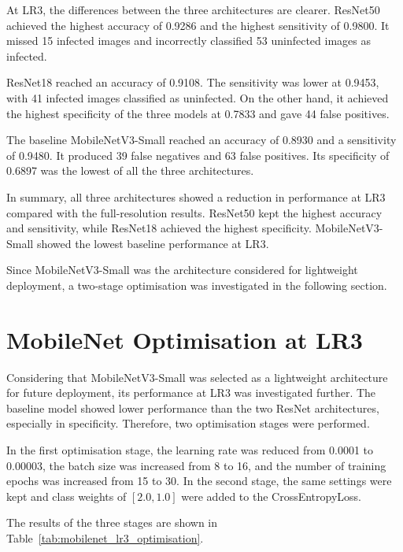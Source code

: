 \FloatBarrier

At LR3, the differences between the three architectures are clearer. ResNet50 achieved the highest accuracy of 0.9286 and the highest sensitivity of 0.9800. It missed 15 infected images and incorrectly classified 53 uninfected images as infected.

ResNet18 reached an accuracy of 0.9108. The sensitivity was lower at 0.9453, with 41 infected images classified as uninfected. On the other hand, it achieved the highest specificity of the three models at 0.7833 and gave 44 false positives.

The baseline MobileNetV3-Small reached an accuracy of 0.8930 and a sensitivity of 0.9480. It produced 39 false negatives and 63 false positives. Its specificity of 0.6897 was the lowest of all the three architectures.

In summary, all three architectures showed a reduction in performance at LR3 compared with the full-resolution results. ResNet50 kept the highest accuracy and sensitivity, while ResNet18 achieved the highest specificity. MobileNetV3-Small showed the lowest baseline performance at LR3. 

Since MobileNetV3-Small was the architecture considered for lightweight deployment, a two-stage optimisation was investigated in the following section.

\section{MobileNet Optimisation at LR3}

Considering that MobileNetV3-Small was selected as a lightweight architecture for future deployment, its performance at LR3 was investigated further. The baseline model showed lower performance than the two ResNet architectures, especially in specificity. Therefore, two optimisation stages were performed.

In the first optimisation stage, the learning rate was reduced from 0.0001 to 0.00003, the batch size was increased from 8 to 16, and the number of training epochs was increased from 15 to 30. In the second stage, the same settings were kept and class weights of \([2.0,1.0]\) were added to the CrossEntropyLoss.

The results of the three stages are shown in Table~\ref{tab:mobilenet_lr3_optimisation}.

